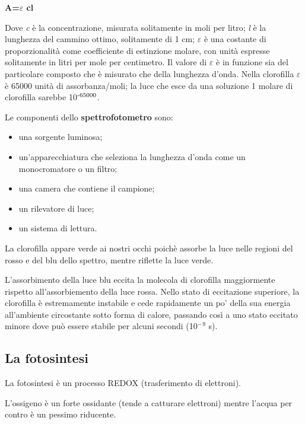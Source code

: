 \documentclass[]{article}
\begin{document}
\begin{center}\textbf{A=$\varepsilon$ cl}\end{center}

Dove \emph{c} è la concentrazione, misurata solitamente in moli per
litro; \emph{l} è la lunghezza del cammino ottimo, solitamente di 1 cm;
$\varepsilon$ è una costante di proporzionalità come coefficiente di
estinzione molare, con unità espresse solitamente in litri per mole per
centimetro. Il valore di $\varepsilon$ è in funzione sia del particolare
composto che è misurato che della lunghezza d'onda. Nella clorofilla
$\varepsilon$ è 65000 unità di assorbanza/moli; la luce che esce da una
soluzione 1 molare di clorofilla sarebbe 10$\textsuperscript{-65000}$.

Le componenti dello \textbf{spettrofotometro} sono:

\begin{itemize}
\itemsep1pt\parskip0pt
\item
  una sorgente luminosa;
\item
  un'apparecchiatura che seleziona la lunghezza d'onda come un
  monocromatore o un filtro;
\item
  una camera che contiene il campione;
\item
  un rilevatore di luce;
\item
  un sistema di lettura.
\end{itemize}

La clorofilla appare verde ai nostri occhi poichè assorbe la luce nelle
regioni del rosso e del blu dello spettro, mentre riflette la luce
verde.

L'assorbimento della luce blu eccita la molecola di clorofilla
maggiormente rispetto all'assorbiemento della luce rossa. Nello stato di
eccitazione superiore, la clorofilla è estremamente instabile e cede
rapidamente un po' della sua energia all'ambiente circostante sotto
forma di calore, passando così a uno stato eccitato minore dove può
essere stabile per alcuni secondi (10$^-$$^9$ s).

\subsection{La fotosintesi}\label{la-fotosintesi}

La fotosintesi è un processo REDOX (trasferimento di elettroni).

L'ossigeno è un forte ossidante (tende a catturare elettroni) mentre
l'acqua per contro è un pessimo riducente.
\end{document}
